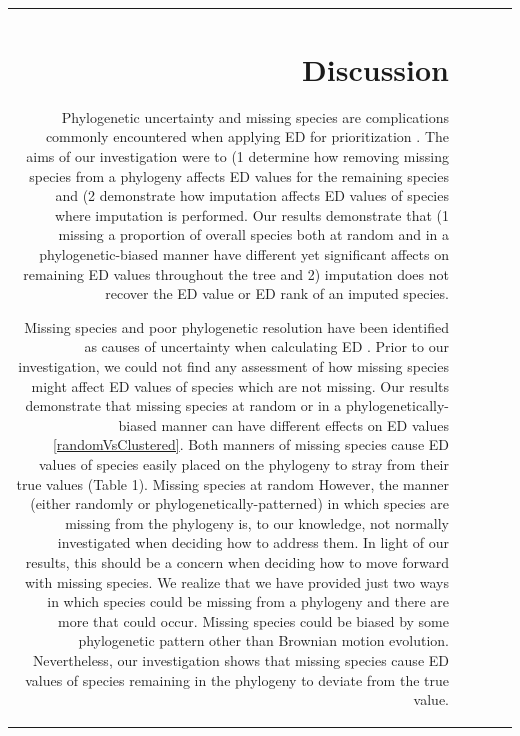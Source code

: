 \documentclass[12pt,english]{article}
\begin{document}
\begin{table}[ht]
\begin{tabular}{rrrrr}
\section*{Discussion}
Phylogenetic uncertainty and missing species are complications commonly
encountered when applying ED for prioritization \autocite{Isaac2007}. The aims
of our investigation were to (1 determine how removing missing species from a
phylogeny affects ED values for the remaining species and (2 demonstrate how
imputation affects ED values of species where imputation is performed. Our
results demonstrate that (1 missing a proportion of overall species both at
random and in a phylogenetic-biased manner have different yet significant
affects on remaining ED values throughout the tree and 2) imputation does not
recover the ED value or ED rank of an imputed species.

Missing species and poor phylogenetic resolution have been identified as causes
of uncertainty when calculating ED \autocite{Isaac2007}. Prior to our
investigation, we could not find any assessment of how missing species might
affect ED values of species which are not missing. Our results demonstrate that
missing species at random or in a phylogenetically-biased manner can have
different effects on ED values \ref{randomVsClustered}. Both manners of missing
species cause ED values of species easily placed on the phylogeny to stray from
their true values (Table 1). Missing species at random  However, the manner
(either randomly or phylogenetically-patterned) in which species are missing
from the phylogeny is, to our knowledge, not normally investigated when deciding
how to address them. In light of our results, this should be a concern when
deciding how to move forward with missing species. We realize that we have
provided just two ways in which species could be missing from a phylogeny and
there are more that could occur. Missing species could be biased by some
phylogenetic pattern other than Brownian motion evolution. Nevertheless, our
investigation shows that missing species cause ED values of species remaining in
the phylogeny to deviate from the true value.


\end{tabular}
\end{table}
\end{document}
